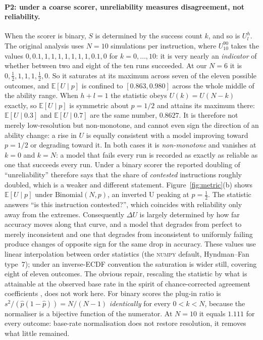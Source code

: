 \documentclass{article}
\begin{document}
\paragraph{P2: under a coarse scorer, unreliability measures disagreement, not reliability.}
When the scorer is binary, $S$ is determined by the success count $k$, and so is $U^h_l$. The
original analysis uses $N = 10$ simulations per instruction, where $U^{90}_{10}$ takes the values
$0, 0.1, 1, 1, 1, 1, 1, 1, 1, 0.1, 0$ for $k = 0, \ldots, 10$: it is very nearly an
\emph{indicator} of whether between two and eight of the ten runs succeeded. At our $N = 6$ it is
$0, \tfrac12, 1, 1, 1, \tfrac12, 0$. So it saturates at its maximum across seven of the eleven possible outcomes, and $\mathbb{E}[U \mid p]$ is confined to $[0.863, 0.980]$ across the whole middle of the ability range. When $h + l = 1$ the statistic obeys $U(k) = U(N-k)$ exactly, so $\mathbb{E}[U \mid p]$ is symmetric about $p = 1/2$ and attains its maximum there: $\mathbb{E}[U \mid 0.3]$ and $\mathbb{E}[U \mid 0.7]$ are the same number, $0.8627$. It is therefore not merely low-resolution but non-monotone, and cannot even sign the direction of an ability change: a rise in $U$ is equally consistent with a model improving toward $p = 1/2$ or degrading toward it. In both cases it is \emph{non-monotone} and vanishes at $k = 0$ and $k = N$: a model that fails
every run is recorded as exactly as reliable as one that succeeds every run. Under a binary scorer
the reported doubling of ``unreliability'' therefore says that the share of \emph{contested}
instructions roughly doubled, which is a weaker and different statement. Figure~\ref{fig:metric}(b) shows $\mathbb{E}[U \mid p]$ under $\mathrm{Binomial}(N, p)$, an
inverted U peaking at $p = \tfrac12$. The statistic answers ``is this instruction contested?'',
which coincides with reliability only away from the extremes. Consequently $\Delta U$ is largely
determined by how far accuracy moves along that curve, and a model that degrades from perfect to
merely inconsistent and one that degrades from inconsistent to uniformly failing produce changes of
opposite sign for the same drop in accuracy. These values use linear interpolation between order statistics (the \textsc{numpy} default, Hyndman--Fan type~7); under an inverse-ECDF convention the saturation is wider still, covering eight of eleven outcomes. The obvious repair, rescaling the statistic by what is attainable at the observed base rate in the spirit of chance-corrected agreement coefficients \citep{fleiss1971measuring}, does not work here. For binary scores the plug-in ratio is $s^2 / (\hat{p}(1-\hat{p})) = N/(N-1)$ \emph{identically} for every $0 < k < N$, because the normaliser is a bijective function of the numerator. At $N = 10$ it equals $1.111$ for every outcome: base-rate normalisation does not restore resolution, it removes what little remained.
\end{document}
